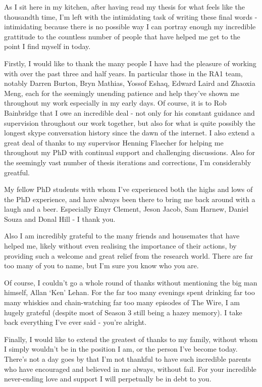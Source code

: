 
\begin{acknowledgements}      

\begin{spacing}{1}
As I sit here in my kitchen, after having read my thesis for what feels like
the
thousandth time, I'm left with the intimidating task of writing these final
words - intimidating because there is no possible way I can portray enough my
incredible grattitude to the countless number of people that have helped me
get to the point I find myself in today.

Firstly, I would like to thank the many people I have had the pleasure of
working with
over the past three and half years. In particular those in
the RA1 team, notably Darren Burton, Bryn Mathias, Yossof Eshaq, Edward
Laird and Zhaoxia Meng, each for the seemingly unending patience and help
they've shown me throughout my work especially in my early days. Of course, it
is to Rob Bainbridge that I
owe an incredible deal - not only for his constant guidance and supervision
throughout our work together, but also for what is quite possibly the longest
skype conversation history since the dawn of the internet.
I also extend a great deal of thanks to my supervisor Henning Flaecher for
helping me throughout my PhD with continual support and challenging discussions.
Also for the seemingly vast number of thesis iterations and corrections, I'm
considerably greatful.

My fellow PhD students with whom I've experienced both the highs and lows of
the PhD experience, and have always been there to bring me back around with a
laugh
and a beer. Especially Emyr Clement, Jeson Jacob, Sam Harnew, Daniel Souza and
Donal Hill - I thank you.

Also I am incredibly grateful to the many friends and housemates that have helped me, likely without
even realising the importance of their actions, by
providing such a welcome and great relief from the research world. There are
far too many of you to name, but I'm sure you know who you are.

Of course, I couldn't go a whole round of thanks without mentioning the big man
himself, Allan `Ken' Lehan. For the far too many evenings spent
drinking far too many whiskies and chain-watching far too many episodes of The
Wire, I am hugely grateful (despite most of Season 3 still being a hazey
memory). I take back everything I've ever said - you're alright.

Finally, I would like to extend the greatest of thanks to my family, without whom
I simply wouldn't be in the position I am, or the person I've become today.
There's not a day goes by that I'm not thankful to have such incredible parents
who have encouraged and believed in me always, without fail.
For your incredible never-ending love and support I will perpetually be in debt
to you.
\end{spacing}

\end{acknowledgements}

